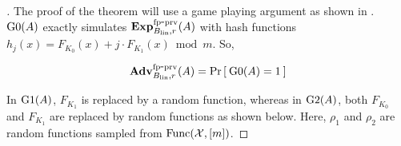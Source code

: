 \begin{proof}[]
The proof of the theorem will use a game playing argument as shown in . $\text{G0}(A)$ exactly simulates $\mathrm{\mathbf{Exp}}^{\mathrm{fp\mbox{-}prv}}_{B_\mathrm{lin},r}(A)$ with hash functions $h_j(x) =  F_{K_0}(x) + j\cdot F_{K_1}(x) \bmod m$. So,

\begin{equation}
\mathrm{\mathbf{Adv}}^{\mathrm{fp\mbox{-}prv}}_{B_{\mathrm{lin}},r}(A) = \Pr\left[\: \text{G0}(A)=1 \:\right]\label{eq:0}
\end{equation}

 In $\text{G1}(A)$, $F_{K_1}$ is replaced by a random function, whereas in $\text{G2}(A)$, both $F_{K_0}$ and $F_{K_1}$ are replaced by random functions as shown below. Here, $\rho_1$ and $\rho_2$ are random functions sampled from $\mathrm{Func}({\cal X},[m])$.



\end{proof}
